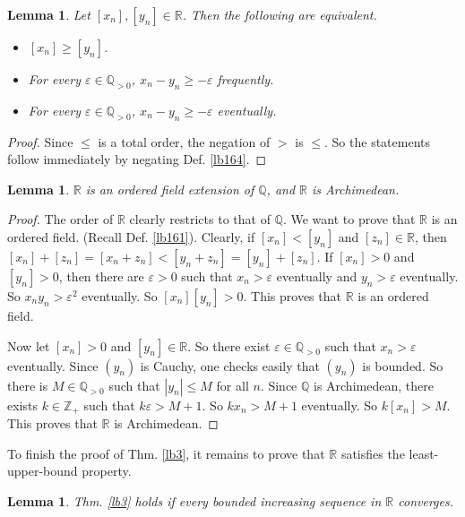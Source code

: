 \documentclass[12pt,b5paper,notitlepage]{article}
\theoremstyle{definition}
\theoremstyle{plain}
\newtheorem{lm}[df]{Lemma}
\newcommand{\Zbb}{\mathbb Z}
\newcommand{\Qbb}{\mathbb Q}
\newcommand{\Rbb}{\mathbb R}
\newcommand{\eps}{\varepsilon}
\numberwithin{equation}{section}
\begin{document}
\begin{lm}\label{lb165}
Let $[x_n],[y_n]\in\Rbb$. Then the following are equivalent.
\begin{itemize}
\item $[x_n]\geq[y_n]$.
\item For every $\eps\in\Qbb_{>0}$, $x_n-y_n\geq-\eps$ frequently.
\item For every $\eps\in\Qbb_{>0}$, $x_n-y_n\geq-\eps$ eventually.
\end{itemize}
\end{lm}

\begin{proof}
Since $\leq$ is a total order, the negation of $>$ is $\leq$. So the statements follow immediately by negating Def. \ref{lb164}.
\end{proof}



\begin{lm}
$\Rbb$ is an ordered field extension of $\Qbb$, and $\Rbb$ is Archimedean.
\end{lm}

\begin{proof}
The order of $\Rbb$ clearly restricts to that of $\Qbb$. We want to prove that $\Rbb$ is an ordered field. (Recall Def. \ref{lb161}). Clearly, if $[x_n]<[y_n]$ and $[z_n]\in\Rbb$, then $[x_n]+[z_n]=[x_n+z_n]<[y_n+z_n]=[y_n]+[z_n]$. If $[x_n]>0$ and $[y_n]>0$, then there are $\eps>0$ such that $x_n>\eps$ eventually and $y_n>\eps$ eventually. So $x_ny_n>\eps^2$ eventually. So $[x_n][y_n]>0$. This proves that $\Rbb$ is an ordered field.

Now let $[x_n]>0$ and $[y_n]\in\Rbb$. So there exist $\eps\in\Qbb_{>0}$ such that $x_n>\eps$ eventually. Since $(y_n)$ is Cauchy, one checks easily that $(y_n)$ is bounded. So there is $M\in\Qbb_{>0}$ such that $|y_n|\leq M$ for all $n$. Since $\Qbb$ is Archimedean, there exists $k\in\Zbb_+$ such that $k\eps>M+1$. So $kx_n>M+1$ eventually. So $k[x_n]>M$. This proves that $\Rbb$ is Archimedean.
\end{proof}




To finish the proof of Thm. \ref{lb3}, it remains to prove that $\Rbb$ satisfies the least-upper-bound property.


\begin{lm}\label{lb162}
Thm. \ref{lb3} holds if every bounded increasing sequence in $\Rbb$ converges.
\end{lm}
\end{document}
